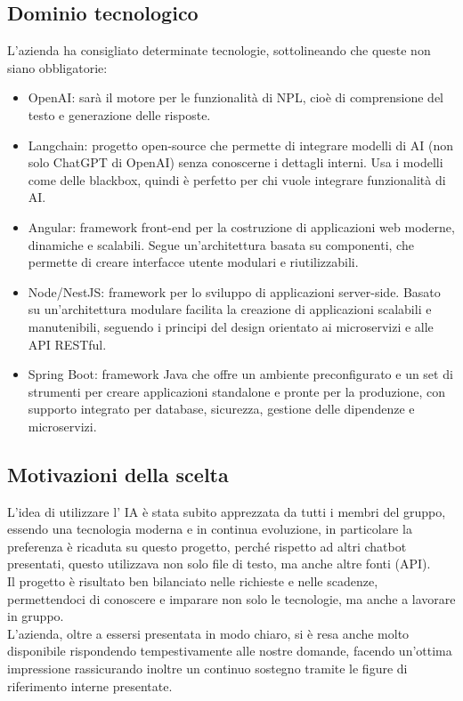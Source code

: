 \documentclass[italian, 12pt]{article}
\begin{document}
\subsection{Dominio tecnologico}
L’azienda ha consigliato determinate tecnologie, sottolineando che queste non siano obbligatorie:
\begin{itemize}
\item OpenAI: sarà il motore per le funzionalità di NPL, cioè di comprensione del testo e generazione delle risposte.

\item Langchain: progetto open-source che permette di integrare modelli di AI (non solo ChatGPT di OpenAI) senza conoscerne i dettagli interni. Usa i modelli come delle blackbox, quindi è perfetto per chi vuole integrare funzionalità di AI.

\item Angular: framework front-end per la costruzione di applicazioni web moderne, dinamiche e scalabili. Segue un'architettura basata su componenti, che permette di creare interfacce utente modulari e riutilizzabili.

\item Node/NestJS: framework per lo sviluppo di applicazioni server-side. Basato su un'architettura modulare facilita la creazione di applicazioni scalabili e manutenibili, seguendo i principi del design orientato ai microservizi e alle API RESTful.

\item Spring Boot: framework Java che offre un ambiente preconfigurato e un set di strumenti per creare applicazioni standalone e pronte per la produzione, con supporto integrato per database, sicurezza, gestione delle dipendenze e microservizi.
\end{itemize}

\subsection{Motivazioni della scelta}
L’idea di utilizzare l’ IA è stata subito apprezzata da tutti i membri del gruppo, essendo una tecnologia moderna e in continua evoluzione, in particolare la preferenza è ricaduta su questo progetto, perché rispetto ad altri chatbot presentati, questo utilizzava non solo file di testo, ma anche altre fonti (API).\\
Il progetto è risultato ben bilanciato nelle richieste e nelle scadenze, permettendoci di conoscere e imparare non solo le tecnologie, ma anche a lavorare in gruppo.\\
L’azienda, oltre a essersi presentata in modo chiaro, si è resa anche molto disponibile rispondendo tempestivamente alle nostre domande, facendo un’ottima impressione rassicurando inoltre un continuo sostegno tramite le figure di riferimento interne presentate.
\end{document}
